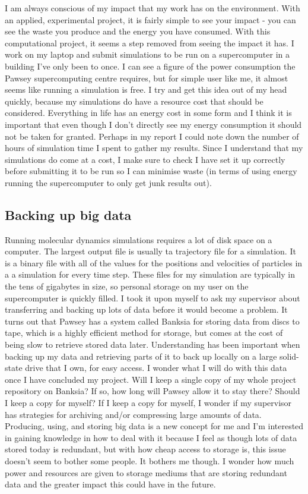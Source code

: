 \documentclass[11pt]{article}
\begin{document}
I am always conscious of my impact that my work has on the environment. With an applied, experimental project, it is fairly simple to see your impact - you can see the waste you produce and the energy you have consumed. With this computational project, it seems a step removed from seeing the impact it has. I work on my laptop and submit simulations to be run on a supercomputer in a building I've only been to once. I can see a figure of the power consumption the Pawsey supercomputing centre requires, but for simple user like me, it almost seems like running a simulation is free. I try and get this idea out of my head quickly, because my simulations do have a resource cost that should be considered. Everything in life has an energy cost in some form and I think it is important that even though I don't directly see my energy consumption it should not be taken for granted. Perhaps in my report I could note down the number of hours of simulation time I spent to gather my results. Since I understand that my simulations do come at a cost, I make sure to check I have set it up correctly before submitting it to be run so I can minimise waste (in terms of using energy running the supercomputer to only get junk results out).

\subsection{Backing up big data}

Running molecular dynamics simulations requires a lot of disk space on a computer. The largest output file is usually ta trajectory file for a simulation. It is a binary file with all of the values for the positions and velocities of particles in a a simulation for every time step. These files for my simulation are typically in the tens of gigabytes in size, so personal storage on my user on the supercomputer is quickly filled. I took it upon myself to ask my supervisor about transferring and backing up lots of data before it would become a problem. It turns out that Pawsey has a system called Banksia for storing data from discs to tape, which is a highly efficient method for storage, but comes at the cost of being slow to retrieve stored data later. Understanding has been important when backing up my data and retrieving parts of it to back up locally on a large solid-state drive that I own, for easy access. I wonder what I will do with this data once I have concluded my project. Will I keep a single copy of my whole project repository on Banksia? If so, how long will Pawsey allow it to stay there? Should I keep a copy for myself? If I keep a copy for myself, I wonder if my supervisor has strategies for archiving and/or compressing large amounts of data. Producing, using, and storing big data is a new concept for me and I'm interested in gaining knowledge in how to deal with it because I feel as though lots of data stored today is redundant, but with how cheap access to storage is, this issue doesn't seem to bother some people. It bothers me though. I wonder how much power and resources are given to storage mediums that are storing redundant data and the greater impact this could have in the future.
\end{document}
